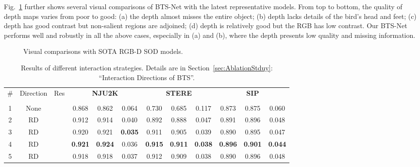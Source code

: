 \documentclass{article}
\begin{document}
  
    Fig.~\ref{visualcomparison} further shows several visual comparisons of BTS-Net with the latest representative models. From top to bottom, the quality of depth maps varies from poor to good: (a) the depth almost misses the entire object; (b) depth lacks details of the bird's head and feet; (c) depth has good contrast but non-salient regions are adjoined; (d) depth is relatively good but the RGB has low contrast. Our BTS-Net performs well and robustly in all the above cases, especially in (a) and (b), where the depth presents low quality and missing information.
\begin{figure}
  \centering
 \centerline{} \vspace{-0.3cm}
  \caption{Visual comparisons with SOTA RGB-D SOD models.}\vspace{-0.3cm}
  \label{visualcomparison}
\end{figure}

\begin{table}[t]
	\centering
	\caption{Results of different interaction strategies. Details are in Section~\ref{sec:AblationStduy}: ``Interaction Directions of BTS''.}\vspace{-0.2cm}
	\label{table:AS1}
	\vspace{8pt}
	\footnotesize
\renewcommand{\tabcolsep}{0.4mm}
	\begin{tabular}{c|c|c|ccc|ccc|ccc}
		\hline\toprule
		\multirow{2}{*}{\#} 
		&\multirow{2}{*}{Direction}
		&\multirow{2}{*}{Res}
		&\multicolumn{3}{c|}{\textbf{NJU2K}}  &\multicolumn{3}{c|}{\textbf{STERE}}
		&\multicolumn{3}{c}{\textbf{SIP}} \\ &&
		&
		& 
		& 
	    &
	    & 
		& 
		&
		& 
		& 
		
\\
		\midrule
		1 &None &  &0.868	&0.862	&0.064	&0.730	&0.685	&0.117	&0.873	&0.875	&0.060
 \\
		2 &RD  & &0.912	&0.914	&0.040	&0.892	&0.888	&0.047	&0.891	&0.896	&0.048
  \\
		 3 &RD  & &0.920	&0.921	&\bf{0.035}	&0.911	&0.905	&0.039	&0.890	&0.895	&0.047
  \\
		4 &RD & &\bf{0.921}	&\bf{0.924}	&0.036	&\bf{0.915}	&\bf{0.911}	&\bf{0.038} &\bf{0.896}	&\bf{0.901}	&\bf{0.044}
\\
		 5 &RD &\checkmark  &0.918	&0.918	&0.037		&0.912	&0.909	&0.038	&0.890	&0.896	&0.048
  \\
		\bottomrule
		\hline
	\end{tabular}
	\vspace{-8pt}
\end{table}
\end{document}

